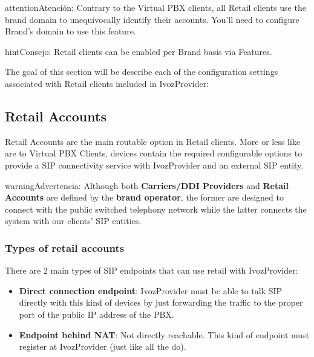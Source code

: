 \documentclass[letterpaper,10pt,spanish]{sphinxmanual}
\begin{document}
\begin{notice}{attention}{Atención:}
Contrary to the Virtual PBX clients, all Retail clients use the
brand domain to unequivocally identify their accounts. You'll need to configure
Brand's domain to use this feature.
\end{notice}

\begin{notice}{hint}{Consejo:}
Retail clients can be enabled per Brand basis via Features.
\end{notice}

The goal of this section will be describe each of the configuration settings
associated with Retail clients included in IvozProvider:


\subsection{Retail Accounts}
\label{administration_portal/client/retail/retail_accounts::doc}\label{administration_portal/client/retail/retail_accounts:retail-accounts}\label{administration_portal/client/retail/retail_accounts:id1}
Retail Accounts are the main routable option in Retail clients.
More or less like {\hyperref[administration_portal/client/vpbx/routing_endpoints/friends/index:friends]{}} are to Virtual PBX Clients, devices
contain the required configurable options to provide a SIP connectivity
service with IvozProvider and an external SIP entity.

\begin{notice}{warning}{Advertencia:}
Although both \textbf{Carriers/DDI Providers} and \textbf{Retail Accounts} are defined by the
\textbf{brand operator}, the former are designed to connect with the public switched telephony network
while the latter connects the system with our clients' SIP entities.
\end{notice}


\subsubsection{Types of retail accounts}
\label{administration_portal/client/retail/retail_accounts:types-of-retail-accounts}
There are 2 main types of SIP endpoints that can use retail with IvozProvider:
\begin{itemize}
\item {} 
\textbf{Direct connection endpoint}: IvozProvider must be able to talk SIP directly with
this kind of devices by just forwarding the traffic to the proper port of
the public IP address of the PBX.

\item {} 
\textbf{Endpoint behind NAT}: Not directly reachable. This kind of endpoint must register at
IvozProvider (just like all the {\hyperref[administration_portal/client/vpbx/terminals:terminals]{}} do).

\end{itemize}
\end{document}
